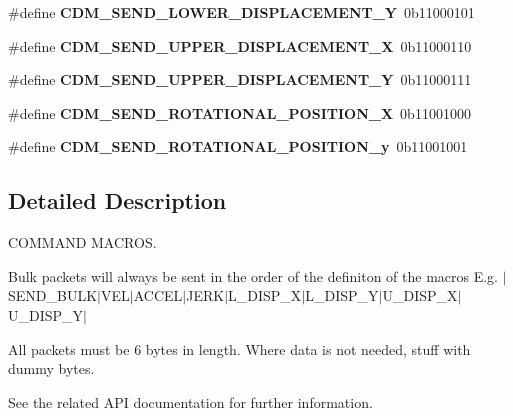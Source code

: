\begin{DoxyCompactItemize}
\item 
\hypertarget{group__cmd__macros_ga78e04d174d1e14c2c3eadec02a593cf0}{}\label{group__cmd__macros_ga78e04d174d1e14c2c3eadec02a593cf0} 
\#define {\bfseries C\+D\+M\+\_\+\+S\+E\+N\+D\+\_\+\+L\+O\+W\+E\+R\+\_\+\+D\+I\+S\+P\+L\+A\+C\+E\+M\+E\+N\+T\+\_\+Y}~0b11000101
\item 
\hypertarget{group__cmd__macros_gacd11edb478c58d9cc68eb64af8d0b934}{}\label{group__cmd__macros_gacd11edb478c58d9cc68eb64af8d0b934} 
\#define {\bfseries C\+D\+M\+\_\+\+S\+E\+N\+D\+\_\+\+U\+P\+P\+E\+R\+\_\+\+D\+I\+S\+P\+L\+A\+C\+E\+M\+E\+N\+T\+\_\+X}~0b11000110
\item 
\hypertarget{group__cmd__macros_ga375a233fff8b4c213c170e4e85050de1}{}\label{group__cmd__macros_ga375a233fff8b4c213c170e4e85050de1} 
\#define {\bfseries C\+D\+M\+\_\+\+S\+E\+N\+D\+\_\+\+U\+P\+P\+E\+R\+\_\+\+D\+I\+S\+P\+L\+A\+C\+E\+M\+E\+N\+T\+\_\+Y}~0b11000111
\item 
\hypertarget{group__cmd__macros_ga1e8c9bb3aa7e96c9ea311c9d618b02bf}{}\label{group__cmd__macros_ga1e8c9bb3aa7e96c9ea311c9d618b02bf} 
\#define {\bfseries C\+D\+M\+\_\+\+S\+E\+N\+D\+\_\+\+R\+O\+T\+A\+T\+I\+O\+N\+A\+L\+\_\+\+P\+O\+S\+I\+T\+I\+O\+N\+\_\+X}~0b11001000
\item 
\hypertarget{group__cmd__macros_ga92ad387ae1da8330fa26f6c10358d70c}{}\label{group__cmd__macros_ga92ad387ae1da8330fa26f6c10358d70c} 
\#define {\bfseries C\+D\+M\+\_\+\+S\+E\+N\+D\+\_\+\+R\+O\+T\+A\+T\+I\+O\+N\+A\+L\+\_\+\+P\+O\+S\+I\+T\+I\+O\+N\+\_\+y}~0b11001001
\end{DoxyCompactItemize}


\subsection{Detailed Description}
C\+O\+M\+M\+A\+ND M\+A\+C\+R\+OS. 

Bulk packets will always be sent in the order of the definiton of the macros E.\+g. $\vert$\+S\+E\+N\+D\+\_\+\+B\+U\+L\+K$\vert$\+V\+E\+L$\vert$\+A\+C\+C\+E\+L$\vert$\+J\+E\+R\+K$\vert$\+L\+\_\+\+D\+I\+S\+P\+\_\+\+X$\vert$\+L\+\_\+\+D\+I\+S\+P\+\_\+\+Y$\vert$\+U\+\_\+\+D\+I\+S\+P\+\_\+\+X$\vert$\+U\+\_\+\+D\+I\+S\+P\+\_\+\+Y$\vert$

All packets must be 6 bytes in length. Where data is not needed, stuff with dummy bytes.

See the related A\+PI documentation for further information. 